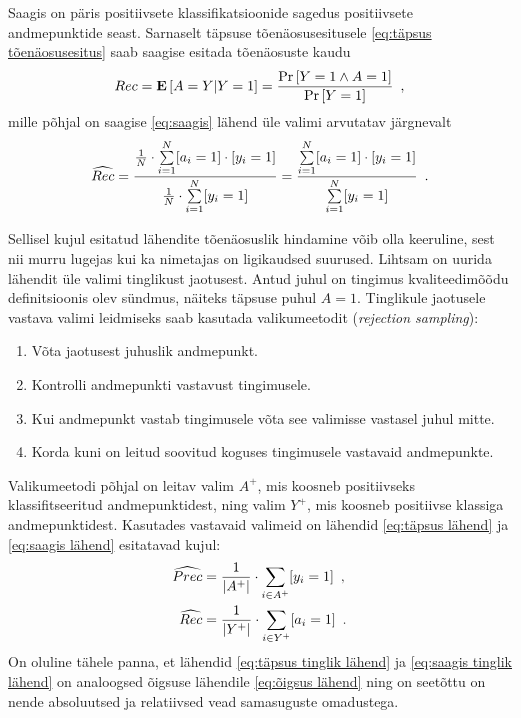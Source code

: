 Saagis on päris positiivsete klassifikatsioonide sagedus positiivsete andmepunktide seast. Sarnaselt täpsuse tõenäosusesitusele \eqref{eq:täpsus tõenäosusesitus} saab saagise esitada tõenäosuste kaudu
\begin{equation*}
    Rec=\operatorname*{\mathbf{E}}\left[A=Y|Y=1\right]=\frac{\Pr\left[Y=1\land A=1\right]}{\Pr\left[Y=1\right]} \enspace,
\end{equation*}
mille põhjal on saagise \eqref{eq:saagis} lähend üle valimi arvutatav järgnevalt
\begin{equation}
    \label{eq:saagis lähend}
    \widehat{Rec}=\frac{\frac{1}{N}\cdot\sum\limits_{i=1}^{N}[a_i=1]\cdot[y_i=1]}{\frac{1}{N}\cdot\sum\limits_{i=1}^{N}[y_i=1]}=\frac{\sum\limits_{i=1}^{N}[a_i=1]\cdot[y_i=1]}{\sum\limits_{i=1}^{N}[y_i=1]} \enspace.
\end{equation}

Sellisel kujul esitatud lähendite tõenäosuslik hindamine võib olla keeruline, sest nii murru lugejas kui ka nimetajas on ligikaudsed suurused. Lihtsam on uurida lähendit üle valimi tinglikust jaotusest. Antud juhul on tingimus kvaliteedimõõdu definitsioonis olev sündmus, näiteks täpsuse puhul $A=1$. Tinglikule jaotusele vastava valimi leidmiseks saab kasutada valikumeetodit (\emph{rejection sampling}):
\begin{enumerate}
    \item Võta jaotusest juhuslik andmepunkt.
    \item Kontrolli andmepunkti vastavust tingimusele.
    \item Kui andmepunkt vastab tingimusele võta see valimisse vastasel juhul mitte.
    \item Korda kuni on leitud soovitud koguses tingimusele vastavaid andmepunkte.
\end{enumerate}

Valikumeetodi põhjal on leitav valim $A^{+}$, mis koosneb positiivseks klassifitseeritud andmepunktidest, ning valim $Y^{+}$, mis koosneb positiivse klassiga andmepunktidest. Kasutades vastavaid valimeid on lähendid \eqref{eq:täpsus lähend} ja \eqref{eq:saagis lähend} esitatavad kujul:
\begin{align}
    \widehat{Prec}&=\frac{1}{|A^{+}|}\cdot\sum_{i\in A^{+}}[y_i=1] \enspace, \label{eq:täpsus tinglik lähend}\\
    \widehat{Rec}&=\frac{1}{|Y^{+}|}\cdot\sum_{i\in Y^{+}}[a_i=1] \label{eq:saagis tinglik lähend}\enspace.
\end{align}
On oluline tähele panna, et lähendid \eqref{eq:täpsus tinglik lähend} ja \eqref{eq:saagis tinglik lähend} on analoogsed õigsuse lähendile \eqref{eq:õigsus lähend} ning on seetõttu on nende absoluutsed ja relatiivsed vead samasuguste omadustega.

